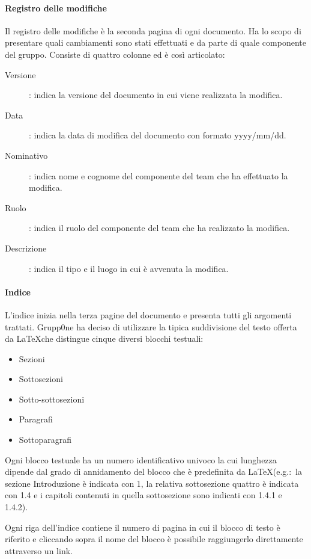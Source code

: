 \documentclass[../norme-di-progetto.tex]{subfiles}
\begin{document}
\paragraph{Registro delle modifiche}%
\label{par:registro delle modifiche}
Il registro delle modifiche è la seconda pagina di ogni documento. Ha lo scopo di presentare quali cambiamenti sono stati effettuati e da parte di quale componente del gruppo. Consiste di quattro colonne ed è così articolato:
\begin{description}
  \item [Versione]: indica la versione del documento in cui viene realizzata la modifica.
  \item [Data]: indica la data di modifica del documento con formato yyyy/mm/dd.
  \item [Nominativo]: indica nome e cognome del componente del team che ha effettuato la modifica.
  \item [Ruolo]: indica il ruolo del componente del team che ha realizzato la modifica.
  \item [Descrizione]: indica il tipo e il luogo in cui è avvenuta la modifica.
\end{description}

\paragraph{Indice}%
\label{par:indice}
L'indice inizia nella terza pagine del documento e presenta tutti gli argomenti trattati. Grupp0ne ha deciso di utilizzare la tipica suddivisione del testo offerta da \LaTeX che distingue cinque diversi blocchi testuali:

\begin{itemize}
  \item Sezioni
  \item Sottosezioni
  \item Sotto-sottosezioni
  \item Paragrafi
  \item Sottoparagrafi
\end{itemize}

Ogni blocco testuale ha un numero identificativo univoco la cui lunghezza dipende dal grado di annidamento del blocco che è predefinita da \LaTeX (e.g.:\ la sezione Introduzione è indicata con 1, la relativa sottosezione quattro è indicata con 1.4 e i capitoli contenuti in quella sottosezione sono indicati con 1.4.1 e 1.4.2).

Ogni riga dell'indice contiene il numero di pagina in cui il blocco di testo è riferito e cliccando sopra il nome del blocco è possibile raggiungerlo direttamente attraverso un link.
\end{document}
